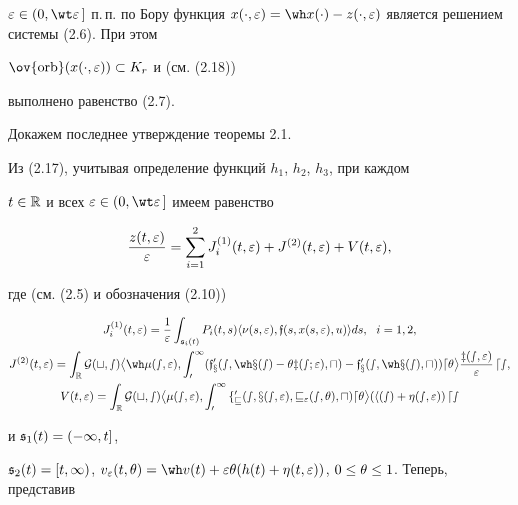 $\ve\in(0,\wt\ve\,]$ п.\,п. по Бору функция $x(\cdot,\ve)= \wh


x(\cdot)-z(\cdot,\ve)$ является решением системы (2.6). При этом


$\ov{\orb}(x(\cdot,\ve))\subset K_r$ и (см. (2.18))


выполнено равенство (2.7).





Докажем последнее утверждение теоремы 2.1.


Из (2.17), учитывая определение функций $h_1$, $h_2$, $h_3$, при каждом


$t\in\Bbb R$ и всех $\ve\in(0,\wt\ve\,]$ имеем равенство


\begin{equation}


\frac{z(t,\ve)}{\ve}=\sum\lt_{i=1}^{2}


J_i^{(1)}(t,\ve)+J^{(2)}(t,\ve)+V(t,\ve),


\end{equation}


где (см. (2.5) и обозначения (2.10))


\begin{gather}


J_i^{(1)}(t,\ve)=\frac{1}{\ve} \int_{\gs_i(t)}


P_i(t,s) \la \nu(s,\ve),\frak{f}(s,x(s,\ve),u) \ra ds,\ \ i=1,2,\notag \\


J^{(2)}(t,\ve)= \int_{\R}


\pG(t,s) \big\la \wh\mu(s,\ve), \int_0^1


(\frak{f}_x'(s,\wh x(s)-\ta z(s;\ve),u)-


\frak{f}_x'(s,\wh x(s),u))d\ta \big\ra


\frac{z(s,\ve)}{\ve}\,ds,\notag \\


%


V(t,\ve)=\int_{\R} \pG(t,s)


\big\la \mu(s,\ve), \int_0^1 f_v'(s,x(s,\ve),v_{\ve}(s,\ta),u)d\ta\big\ra


(h(s)+\eta(s,\ve))\,ds


\end{gather}


и $\frak s_1(t)=(-\infty,t]$,


$\gs_2(t)=[t,\infty)$, $v_{\ve}(t,\ta)=\wh


v(t)+\ve\ta(h(t)+\eta(t,\ve))$, $0\le\ta\le 1$. Теперь, представив


